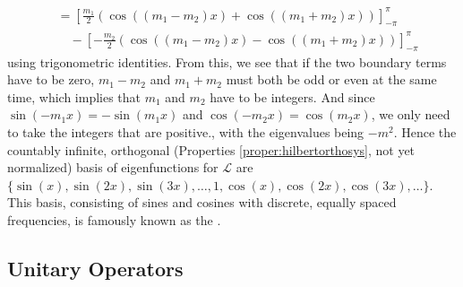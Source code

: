 \begin{solution}
{\begin{align*}
&= [\frac{m_1}{2}(\cos((m_1-m_2)x) + \cos((m_1+m_2)x))]_{-\pi}^\pi \\
&\quad - [-\frac{m_2}{2}(\cos((m_1-m_2)x) - \cos((m_1+m_2)x))]_{-\pi}^\pi 
\end{align*}
using trigonometric identities. From this, we see that if the two boundary terms have to be zero, $m_1 - m_2$ and $m_1 + m_2$ must both be odd or even at the same time, which implies that $m_1$ and $m_2$ have to be integers. And since $\sin(-m_1 x) = -\sin(m_1 x)$ and $\cos(-m_2 x) = \cos(m_2 x)$, we only need to take the integers that are positive.}, with the eigenvalues being $-m^2$. Hence the countably infinite, orthogonal\footnotemark{} (Properties \ref{proper:hilbertorthosys}, not yet normalized) basis of eigenfunctions for $\mathcal{L}$ are $\{\sin(x), \sin(2x), \sin(3x), \ldots, 1, \cos(x), \cos(2x), \cos(3x), \ldots\}$. This basis, consisting of sines and cosines with discrete, equally spaced frequencies, is famously known as the .
\end{solution}

\subsection{Unitary Operators}

